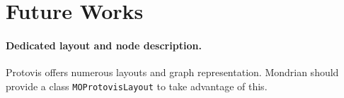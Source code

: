 \documentclass[preprint,10pt]{sigplanconf}
\newcommand{\ct}{\lstinline[backgroundcolor=\color{white},basicstyle=\footnotesize\ttfamily]}
\newcommand{\ab}[1]{\nb{Alexandre}{blue}{#1}}
\newcommand{\sv}[1]{\nb{Santiago}{orange}{#1}}
\newcommand{\seclabel}[1]{\label{sec:#1}}
\begin{document}

%
%
%
%




\section{Future Works}\seclabel{results}

\paragraph{Dedicated layout and node description.} Protovis offers numerous layouts and graph representation. Mondrian should provide a class \ct{MOProtovisLayout} to take advantage of this.

\end{document}
